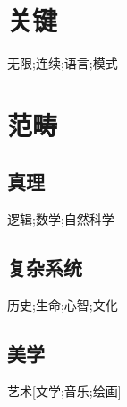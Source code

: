 \documentclass{ctexart}
\begin{document}
\section{关键}

无限;连续;语言;模式

\section{范畴}

\subsection{真理}
逻辑;数学;自然科学

\subsection{复杂系统}
历史;生命;心智;文化

\subsection{美学}
艺术[文学;音乐;绘画]
\end{document}
